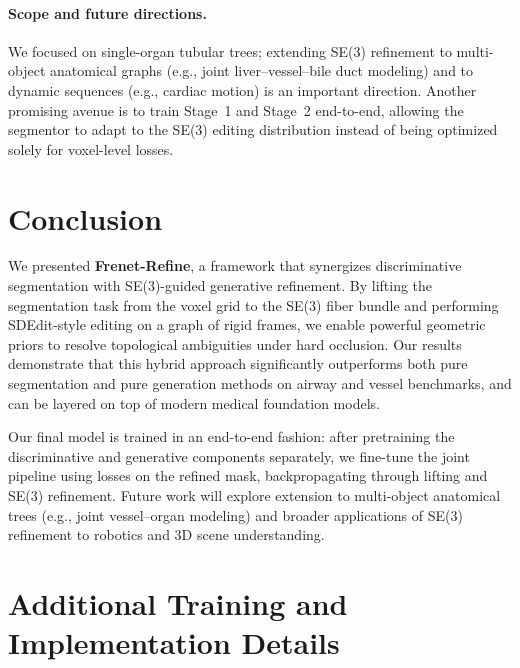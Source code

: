 \documentclass{article}
\newcommand{\modelname}{Frenet-Refine}
\begin{document}
\paragraph{Scope and future directions.}
We focused on single-organ tubular trees; extending SE(3) refinement to multi-object anatomical graphs (e.g., joint liver--vessel--bile duct modeling) and to dynamic sequences (e.g., cardiac motion) is an important direction. Another promising avenue is to train Stage~1 and Stage~2 end-to-end, allowing the segmentor to adapt to the SE(3) editing distribution instead of being optimized solely for voxel-level losses.


\section{Conclusion}

We presented \textbf{\modelname}, a framework that synergizes discriminative segmentation with SE(3)-guided generative refinement. By lifting the segmentation task from the voxel grid to the SE(3) fiber bundle and performing SDEdit-style editing on a graph of rigid frames, we enable powerful geometric priors to resolve topological ambiguities under hard occlusion. Our results demonstrate that this hybrid approach significantly outperforms both pure segmentation and pure generation methods on airway and vessel benchmarks, and can be layered on top of modern medical foundation models. 

Our final model is trained in an end-to-end fashion: after pretraining the discriminative and generative components separately, we fine-tune the joint pipeline using losses on the refined mask, backpropagating through lifting and SE(3) refinement. Future work will explore extension to multi-object anatomical trees (e.g., joint vessel--organ modeling) and broader applications of SE(3) refinement to robotics and 3D scene understanding.

{\small

% 
% 
}
\clearpage
\appendix

\section{Additional Training and Implementation Details}
\label{sec:appendix_training}
\end{document}
